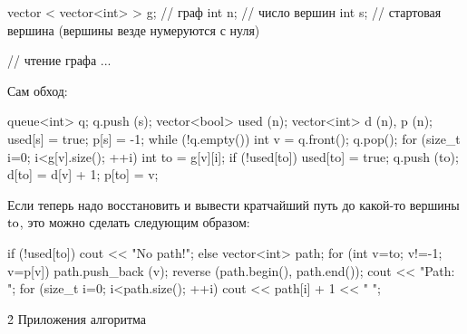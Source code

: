 vector < vector<int> > g; // граф
int n; // число вершин
int s; // стартовая вершина (вершины везде нумеруются с нуля)

// чтение графа
...
\endcode

Сам обход:

\code

queue<int> q;
q.push (s);
vector<bool> used (n);
vector<int> d (n), p (n);
used[s] = true;
p[s] = -1;
while (!q.empty()) {
	int v = q.front();
	q.pop();
	for (size_t i=0; i<g[v].size(); ++i) {
		int to = g[v][i];
		if (!used[to]) {
			used[to] = true;
			q.push (to);
			d[to] = d[v] + 1;
			p[to] = v;
		}
	}
}
\endcode

Если теперь надо восстановить и вывести кратчайший путь до какой-то вершины $\rm to$, это можно сделать следующим образом:

\code

if (!used[to])
	cout << "No path!";
else {
	vector<int> path;
	for (int v=to; v!=-1; v=p[v])
		path.push_back (v);
	reverse (path.begin(), path.end());
	cout << "Path: ";
	for (size_t i=0; i<path.size(); ++i)
		cout << path[i] + 1 << " ";
}
\endcode


\h2{ Приложения алгоритма }

